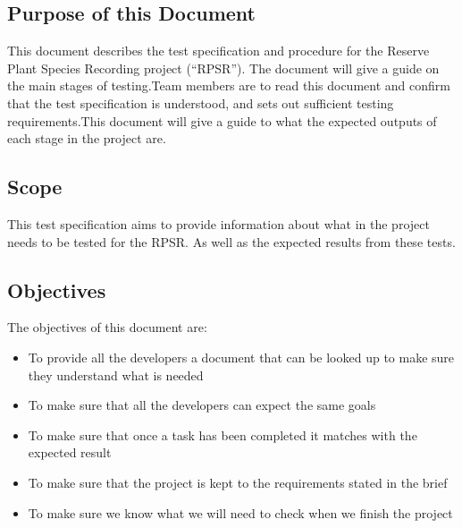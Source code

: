 \subsection{Purpose of this Document}
	This document describes the test specification and procedure for the Reserve Plant Species Recording project (``RPSR'').	The document will give a guide on the main stages of testing.Team members are to read this document and confirm that the test specification is understood, and sets out sufficient testing requirements.This document will give a guide to what the expected outputs of each stage in the project are.
	
\subsection{Scope}
	This test specification aims to provide information about what in the project needs to be tested for the RPSR. As well as the expected results from these tests.

\subsection{Objectives}
	The objectives of this document are:
	\begin{itemize}
		\item To provide all the developers a document that can be looked up to make sure they understand what is needed
		\item To make sure that all the developers can expect the same goals
		\item To make sure that once a task has been completed it matches with the expected result
		\item To make sure that the project is kept to the requirements stated in the brief
		\item To make sure we know what we will need to check when we finish the project
	\end{itemize}